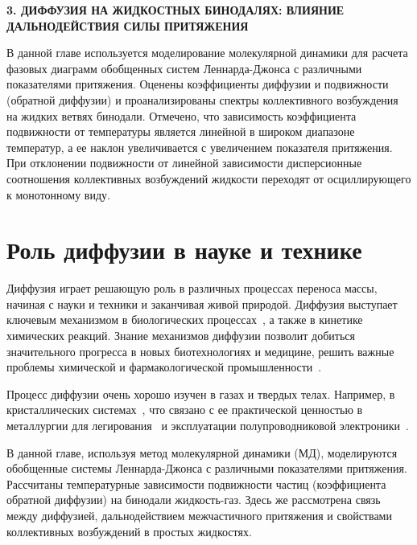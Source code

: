 \newpage
\begin{center}
  \textbf{\large 3. ДИФФУЗИЯ НА ЖИДКОСТНЫХ БИНОДАЛЯХ: ВЛИЯНИЕ ДАЛЬНОДЕЙСТВИЯ СИЛЫ ПРИТЯЖЕНИЯ}
\end{center}


В данной главе используется моделирование молекулярной динамики для расчета фазовых диаграмм обобщенных систем Леннарда-Джонса с различными показателями притяжения.
Оценены коэффициенты диффузии и подвижности (обратной диффузии) и проанализированы спектры коллективного возбуждения на жидких ветвях бинодали.
Отмечено, что зависимость коэффициента подвижности от температуры является линейной в широком диапазоне температур, а ее наклон увеличивается с увеличением показателя притяжения.
При отклонении подвижности от линейной зависимости дисперсионные соотношения коллективных возбуждений жидкости переходят от осциллирующего к монотонному виду.

\section{Роль диффузии в науке и технике}
\label{MACR-SecIntroduction}

Диффузия играет решающую роль в различных процессах переноса массы, начиная с науки и техники и заканчивая живой природой.
Диффузия выступает ключевым механизмом в биологических процессах~\cite{10.1016/j.bbagen.2013.09.037, 10.1038/s41598-018-22643-9}, а также в кинетике химических реакций.
Знание механизмов диффузии позволит добиться значительного прогресса в новых биотехнологиях и медицине, решить важные проблемы химической и фармакологической промышленности~\cite{10.1002/3527602836}.

Процесс диффузии очень хорошо изучен в газах и твердых телах.
Например, в кристаллических системах~\cite{10.1016/0079-6816(95)00039-2}, что связано с ее практической ценностью в металлургии для легирования~\cite{10.1016/s0924-0136(96)02826-9, 10.1016/j.actamat.2015.10.010, 10.1134/s1063783411110308} и эксплуатации полупроводниковой электроники~\cite{10.1103/physrevlett.84.4220, 10.1016/j.physrep.2009.10.003}.

В данной главе, используя метод молекулярной динамики (МД), моделируются обобщенные системы Леннарда-Джонса с различными показателями притяжения.
Рассчитаны температурные зависимости подвижности частиц (коэффициента обратной диффузии) на бинодали жидкость-газ.
Здесь же рассмотрена связь между диффузией, дальнодействием межчастичного притяжения и свойствами коллективных возбуждений в простых жидкостях.

